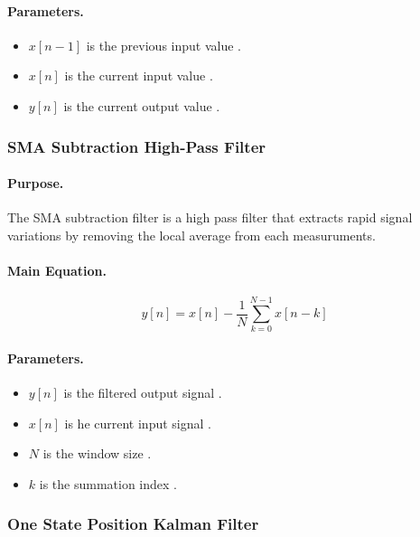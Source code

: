 \paragraph{Parameters.}
\begin{itemize}
\item $x[n-1]$ is the previous input value . 
\item $x[n]$ is the current input value . 
\item $y[n]$ is the current output value . 
\end{itemize}
\subsubsection{SMA Subtraction High-Pass Filter}

\paragraph{Purpose.}
The SMA subtraction filter is a high pass filter that extracts rapid signal 
variations by removing the local average from each measuruments.

\paragraph{Main Equation.}
\begin{equation}
    y[n] = x[n] - \frac{1}{N}\sum_{k=0}^{N-1} x[n-k]
    \label{eq:sma_sub}
\end{equation}

\paragraph{Parameters.}
\begin{itemize}
\item $y[n]$ is the filtered output signal . 
\item $x[n]$ is he current input signal .
\item $N$ is the window size . 
\item $k$ is the summation index .
\end{itemize}
\subsubsection{One State Position Kalman Filter}

